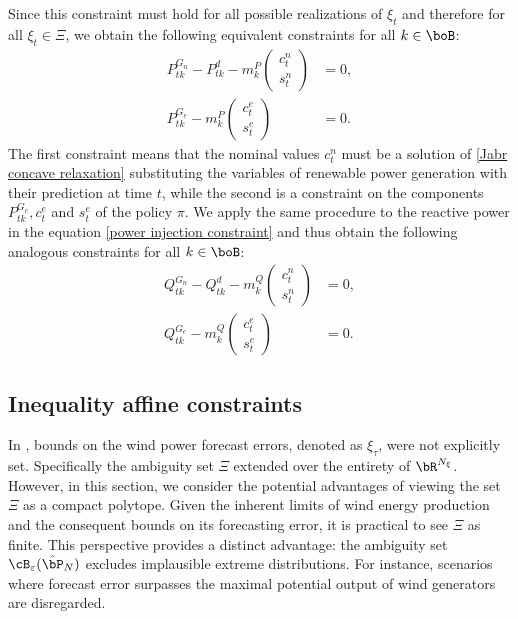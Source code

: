 \documentclass[11pt,a4paper,oneside,openany]{book}
\numberwithin{definition}{section}
\numberwithin{theorem}{section}
\numberwithin{problem}{section}
\begin{document}
Since this constraint must hold for all possible realizations of $\xi_t$ and therefore for all $\xi_t \in \Xi$, we obtain the following equivalent constraints for all $k \in \boB$:
\begin{align}
    P^{G_n}_{tk} - P_{tk}^d - m_k^P \begin{pmatrix} c_t^n \\ s_t^n \end{pmatrix} &= 0, \\
    P_{tk}^{G_e}-m_k^P  \begin{pmatrix} c_t^e \\ s_t^e \end{pmatrix} &= 0.
\end{align}
The first constraint means that the nominal values $c^n_t$ must be a solution of \eqref{Jabr concave relaxation} substituting the variables of renewable power generation with their prediction at time $t$, while the second is a constraint on the components $P_{tk}^{G_e}, c_t^e$ and $s_t^e$ of the policy $\pi$. We apply the same procedure to the reactive power in the equation \eqref{power injection constraint} and thus obtain the following analogous constraints for all $k \in \boB$:
\begin{align}
       Q^{G_n}_{tk} - Q_{tk}^d - m_k^Q \begin{pmatrix} c_t^n \\ s_t^n \end{pmatrix} &= 0, \\
    Q_{tk}^{G_e}-m_k^Q  \begin{pmatrix} c_t^e \\ s_t^e \end{pmatrix} &= 0.  
\end{align}


\subsection{Inequality affine constraints}
\label{Inequality affine constraints}
In \cite{DBDRSOPF2}, bounds on the wind power forecast errors, denoted as $\xi_{\tau}$, were not explicitly set. Specifically the ambiguity set $\Xi$ extended over the entirety of $\bR^{N_{\xi}}$. However, in this section, we consider the potential advantages of viewing the set $\Xi$ as a compact polytope. Given the inherent limits of wind energy production and the consequent bounds on its forecasting error, it is practical to see \(\Xi\) as finite. This perspective provides a distinct advantage: the ambiguity set $\cB_{\varepsilon}(\hat \bP_N)$ excludes implausible extreme distributions. For instance, scenarios where forecast error surpasses the maximal potential output of wind generators are disregarded.
\end{document}
